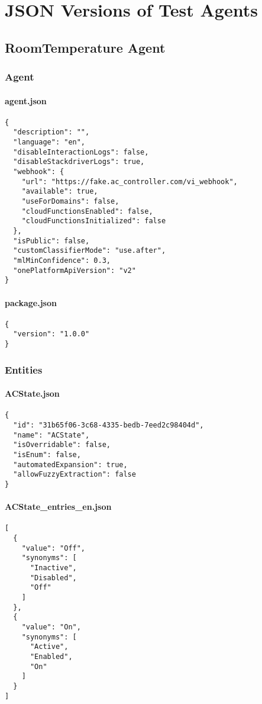 \chapter{JSON Versions of Test Agents}
\section{RoomTemperature Agent}
\label{RoomTemperature Agent JSON}
\subsection{Agent}
\subsubsection{agent.json}
\begin{lstlisting}
{
  "description": "",
  "language": "en",
  "disableInteractionLogs": false,
  "disableStackdriverLogs": true,
  "webhook": {
    "url": "https://fake.ac_controller.com/vi_webhook",
    "available": true,
    "useForDomains": false,
    "cloudFunctionsEnabled": false,
    "cloudFunctionsInitialized": false
  },
  "isPublic": false,
  "customClassifierMode": "use.after",
  "mlMinConfidence": 0.3,
  "onePlatformApiVersion": "v2"
}
\end{lstlisting}
\subsubsection{package.json}
\begin{lstlisting}
{
  "version": "1.0.0"
}
\end{lstlisting}
\subsection{Entities}
\subsubsection{ACState.json}
\begin{lstlisting}
{
  "id": "31b65f06-3c68-4335-bedb-7eed2c98404d",
  "name": "ACState",
  "isOverridable": false,
  "isEnum": false,
  "automatedExpansion": true,
  "allowFuzzyExtraction": false
}	
\end{lstlisting}
\subsubsection{ACState\_entries\_en.json}
\begin{lstlisting}
[
  {
    "value": "Off",
    "synonyms": [
      "Inactive",
      "Disabled",
      "Off"
    ]
  },
  {
    "value": "On",
    "synonyms": [
      "Active",
      "Enabled",
      "On"
    ]
  }
]
\end{lstlisting}

